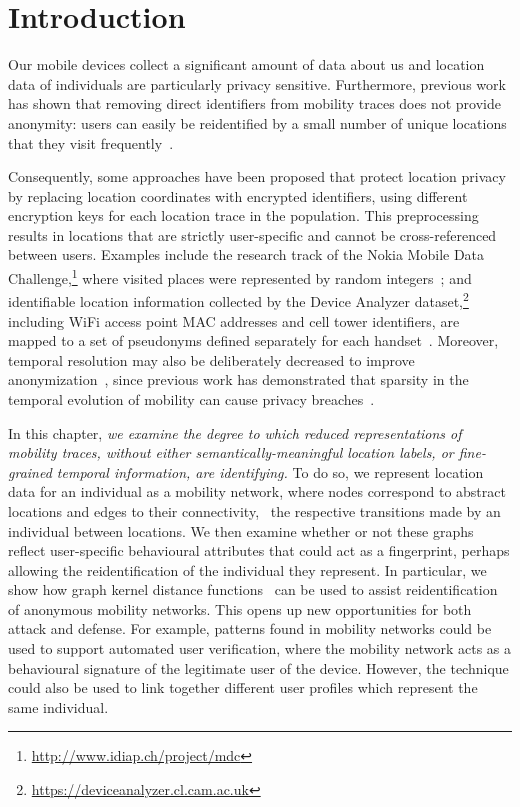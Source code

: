 \section{Introduction}

Our mobile devices collect a significant amount of data about us and location data of individuals are particularly privacy sensitive.
Furthermore, previous work has shown that removing direct identifiers from mobility traces does not provide anonymity: users can easily be reidentified by a small number of unique locations that they visit frequently~\cite{DeMontjoye2013, Zang2011}.

Consequently, some approaches have been proposed that protect location privacy by replacing location coordinates with encrypted identifiers, using different encryption keys for each location trace in the population.
This preprocessing results in locations that are strictly user-specific and cannot be cross-referenced between users.
Examples include the research track of the Nokia Mobile Data Challenge,\footnote{\url{http://www.idiap.ch/project/mdc}} where visited places were represented by random integers~\cite{Laurila}; and identifiable location information collected by the Device Analyzer dataset,\footnote{\url{https://deviceanalyzer.cl.cam.ac.uk}} including WiFi access point MAC addresses and cell tower identifiers, are mapped to a set of pseudonyms defined separately for each handset~\cite{Wagner2014}.
Moreover, temporal resolution may also be deliberately decreased to improve anonymization~\cite{Gruteser}, since previous work has demonstrated that sparsity in the temporal evolution of mobility can cause privacy breaches~\cite{DeMontjoye2013}.

In this chapter, \emph{we examine the degree to which reduced representations of mobility traces, without either semantically-meaningful location labels, or fine-grained temporal information, are identifying.}
To do so, we represent location data for an individual as a mobility network, where nodes correspond to abstract locations and edges to their connectivity, \ie\ the respective transitions made by an individual between locations.
We then examine whether or not these graphs reflect user-specific behavioural attributes that could act as a fingerprint, perhaps allowing the reidentification of the individual they represent.
In particular, we show how graph kernel distance functions~\cite{Vishwanathan2010} can be used to assist reidentification of anonymous mobility networks.
This opens up new opportunities for both attack and defense.
For example, patterns found in mobility networks could be used to support automated user verification, where the mobility network acts as a behavioural signature of the legitimate user of the device.
However, the technique could also be used to link together different user profiles which represent the same individual.


